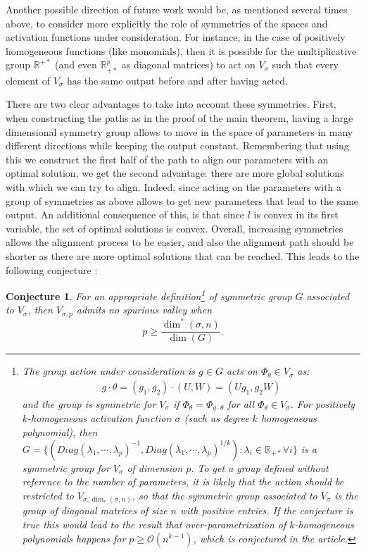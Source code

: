 \documentclass[11pt]{article} %
\newtheorem{conjecture}{Conjecture}[section]
\begin{document}
\par
Another possible direction of future work would be, as mentioned several times above, to consider more explicitly the role of symmetries of the spaces and activation functions under consideration. For instance, in the case of positively homogeneous functions (like monomials), then it is possible for the multiplicative group $\mathbb{R}^{+*}$ (and even $\mathbb{R}_{+*}^{p}$ as diagonal matrices) to act on $V_\sigma$ such that every element of $V_\sigma$ has the same output before and after having acted. 
\par
There are two clear advantages to take into account these symmetries. First, when constructing the paths as in the proof of the main theorem, having a large dimensional symmetry group allows to move in the space of parameters in many different directions while keeping the output constant. Remembering that using this we construct the first half of the path to align our parameters with an optimal solution, we get the second advantage: there are more global solutions with which we can try to align. Indeed, since acting on the parameters with a group of symmetries as above allows to get new parameters that lead to the same output. An additional consequence of this, is that since $l$ is convex in its first variable, the set of optimal solutions is convex. Overall, increasing symmetries allows the alignment process to be easier, and also the alignment path should be shorter as there are more optimal solutions that can be reached. This leads to the following conjecture :
\begin{conjecture}
	For an appropriate definition\footnote{The group action under consideration is $g\in G$ acts on $\Phi_\theta \in V_\sigma$ as:
	\begin{align*}
		g\cdot \theta = (g_1, g_2) \cdot (U, W) = (U g_1, g_2 W) 	
	\end{align*}
	and the group is symmetric for $V_\sigma$ if $\Phi_\theta = \Phi_{g\cdot\theta}$ for all $\Phi_\theta \in V_\sigma$. \newline
	For positively $k$-homogeneous activation function $\sigma$ (such as degree $k$ homogeneous polynomial), then $G = \{(Diag(\lambda_1, \cdots, \lambda_p)^{-1}, Diag(\lambda_1, \cdots, \lambda_p)^{1/k}) : \lambda_i \in \mathbb{R}_{+*} \forall i\}$ is a symmetric group for $V_\sigma$ of dimension $p$. To get a group defined without reference to the number of parameters, it is likely that the action should be restricted to $V_{\sigma, \dim_*(\sigma, n)}$, so that the symmetric group associated to $V_\sigma$ is the group of diagonal matrices of size $n$ with positive entries. If the conjecture is true this would lead to the result that over-parametrization of $k$-homogeneous polynomials happens for $p\geq \mathcal{O}(n^{k-1})$, which is conjectured in the article.  
} of symmetric group $G$ associated to $V_\sigma$, then $V_{\sigma, p}$ admits no spurious valley when 
	\begin{equation*}
		p \geq \frac{\dim^*(\sigma, n)}{\dim(G)}.
	\end{equation*}
\end{conjecture}
\end{document}
